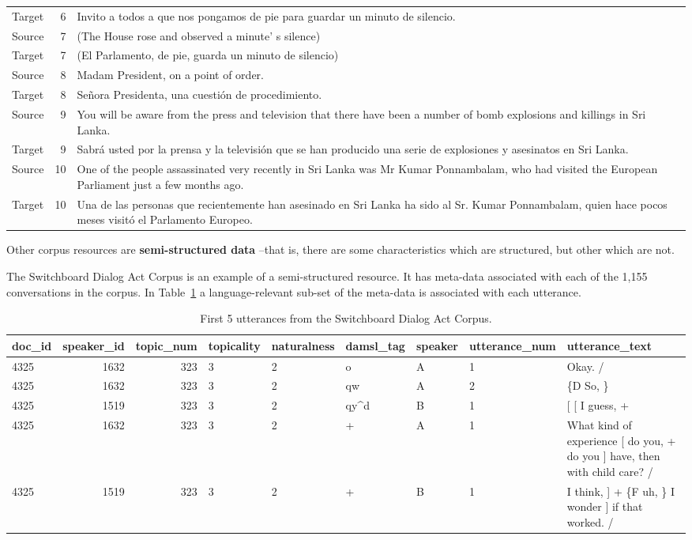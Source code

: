 \documentclass[
  letterpaper,
]{scrbook}
\begin{document}
\begin{table}
\begin{tabular}{lrl}
Target & 6 & Invito a todos a que nos pongamos de pie para guardar un minuto de silencio.\\
Source & 7 & (The House rose and observed a minute' s silence)\\
Target & 7 & (El Parlamento, de pie, guarda un minuto de silencio)\\
Source & 8 & Madam President, on a point of order.\\
\addlinespace
Target & 8 & Señora Presidenta, una cuestión de procedimiento.\\
Source & 9 & You will be aware from the press and television that there have been a number of bomb explosions and killings in Sri Lanka.\\
Target & 9 & Sabrá usted por la prensa y la televisión que se han producido una serie de explosiones y asesinatos en Sri Lanka.\\
Source & 10 & One of the people assassinated very recently in Sri Lanka was Mr Kumar Ponnambalam, who had visited the European Parliament just a few months ago.\\
Target & 10 & Una de las personas que recientemente han asesinado en Sri Lanka ha sido al Sr. Kumar Ponnambalam, quien hace pocos meses visitó el Parlamento Europeo.\\
\bottomrule
\end{tabular}
\end{table}

Other corpus resources are \textbf{semi-structured data} --that is,
there are some characteristics which are structured, but other which are
not.

The Switchboard Dialog Act Corpus is an example of a semi-structured
resource. It has meta-data associated with each of the 1,155
conversations in the corpus. In Table~\ref{tbl-structure-swda} a
language-relevant sub-set of the meta-data is associated with each
utterance.

\hypertarget{tbl-structure-swda}{}
\begin{table}
\caption{\label{tbl-structure-swda}First 5 utterances from the Switchboard Dialog Act Corpus. }\tabularnewline

\centering
\begin{tabular}{lrrllllll}
\toprule
doc\_id & speaker\_id & topic\_num & topicality & naturalness & damsl\_tag & speaker & utterance\_num & utterance\_text\\
\midrule
4325 & 1632 & 323 & 3 & 2 & o & A & 1 & Okay.  /\\
4325 & 1632 & 323 & 3 & 2 & qw & A & 2 & \{D So, \}\\
4325 & 1519 & 323 & 3 & 2 & qy\textasciicircum{}d & B & 1 & {}[ [ I guess, +\\
4325 & 1632 & 323 & 3 & 2 & + & A & 1 & What kind of experience [ do you, + do you ] have, then with child care? /\\
4325 & 1519 & 323 & 3 & 2 & + & B & 1 & I think, ] + \{F uh, \} I wonder ] if that worked. /\\
\bottomrule
\end{tabular}
\end{table}
\end{document}
